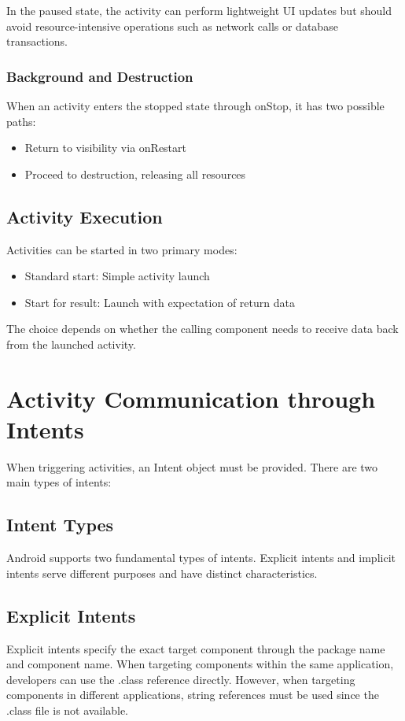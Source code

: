 \documentclass{article}
\begin{document}
In the paused state, the activity can perform lightweight UI updates but should avoid resource-intensive operations such as network calls or database transactions.

\subsubsection{Background and Destruction}
When an activity enters the stopped state through onStop, it has two possible paths:
\begin{itemize}
    \item Return to visibility via onRestart
    \item Proceed to destruction, releasing all resources
\end{itemize}

\subsection{Activity Execution}
Activities can be started in two primary modes:
\begin{itemize}
    \item Standard start: Simple activity launch
    \item Start for result: Launch with expectation of return data
\end{itemize}

The choice depends on whether the calling component needs to receive data back from the launched activity.
\section{Activity Communication through Intents}
When triggering activities, an Intent object must be provided. There are two main types of intents:

\subsection{Intent Types}

Android supports two fundamental types of intents. Explicit intents and implicit intents serve different purposes and have distinct characteristics.

\subsection{Explicit Intents}

Explicit intents specify the exact target component through the package name and component name. When targeting components within the same application, developers can use the .class reference directly. However, when targeting components in different applications, string references must be used since the .class file is not available.
\end{document}
